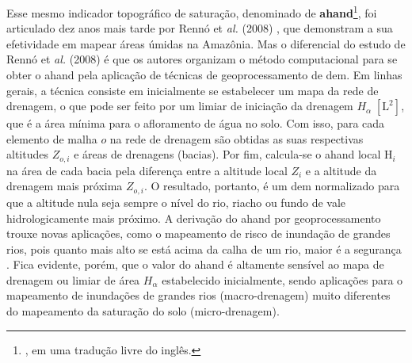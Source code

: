 \documentclass[./main.tex]{subfiles}
\begin{document}
\par Esse mesmo indicador topográfico de saturação, denominado de \textbf{\acrfull{ahand}}\footnote{, em uma tradução livre do inglês.}, foi articulado dez anos mais tarde por Rennó et \textit{al.} (2008) \cite{Renno2008a}, que demonstram a sua efetividade em mapear áreas úmidas na Amazônia. Mas o diferencial do estudo de Rennó et \textit{al.} (2008) é que os autores organizam o método computacional para se obter o \acrshort{ahand} pela aplicação de técnicas de geoprocessamento de \acrshort{dem}. Em linhas gerais, a técnica consiste em inicialmente se estabelecer um mapa da rede de drenagem, o que pode ser feito por um limiar de iniciação da drenagem $H_{\alpha}\;[\text{L}^2]$, que é a área mínima para o afloramento de água no solo. Com isso, para cada elemento de malha $o$ na rede de drenagem são obtidas as suas respectivas altitudes $Z_{o, i}$ e áreas de drenagens (bacias). Por fim, calcula-se o \acrshort{ahand} local $\text{H}_i$ na área de cada bacia pela diferença entre a altitude local $Z_{i}$ e a altitude da drenagem mais próxima $Z_{o, i}$. O resultado, portanto, é um \acrlong{dem} normalizado para que a altitude nula seja sempre o nível do rio, riacho ou fundo de vale hidrologicamente mais próximo. A derivação do \acrshort{ahand} por geoprocessamento trouxe novas aplicações, como o mapeamento de risco de inundação de grandes rios, pois quanto mais alto se está acima da calha de um rio, maior é a segurança \cite{Nobre2016a}. Fica evidente, porém, que o valor do \acrshort{ahand} é altamente sensível ao mapa de drenagem ou limiar de área $H_{\alpha}$ estabelecido inicialmente, sendo aplicações para o mapeamento de inundações de grandes rios (macro-drenagem) muito diferentes do mapeamento da saturação do solo (micro-drenagem).
\end{document}
